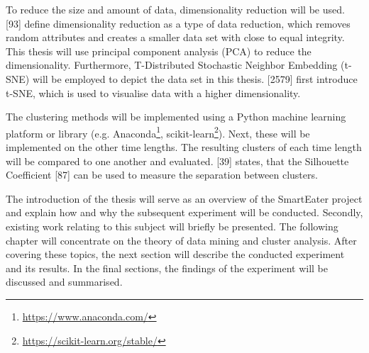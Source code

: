 \documentclass[12pt,a4paper]{article}
\begin{document}
To reduce the size and amount of data, dimensionality reduction will be used. \textcite{han2011data}[93] define dimensionality reduction as a type of data reduction, which removes random attributes and creates a smaller data set with close to equal integrity. This thesis will use principal component analysis (PCA) to reduce the dimensionality.
Furthermore, T-Distributed Stochastic Neighbor Embedding (t-SNE) will be employed to depict the data set in this thesis. \textcite{maaten2008visualizing}[2579] first introduce t-SNE, which is used to visualise data with a higher dimensionality. 

The clustering methods will be implemented using a Python machine learning platform or library (e.g. Anaconda\footnote{\url{https://www.anaconda.com/}}, scikit-learn\footnote{\url{https://scikit-learn.org/stable/}}). Next, these will be implemented on the other time lengths. The resulting clusters of each time length will be compared to one another and evaluated. \textcite{berkhin2006survey}[39] states, that the Silhouette Coefficient \autocite{kaufman2009finding}[87] can be used to measure the separation between clusters.



The introduction of the thesis will serve as an overview of the SmartEater project and explain how and why the subsequent experiment will be conducted. Secondly, existing work relating to this subject will briefly be presented. The following chapter will concentrate on the theory of data mining and cluster analysis. After covering these topics, the next section will describe the conducted experiment and its results. In the final sections, the findings of the experiment will be discussed and summarised. 







\end{document}
